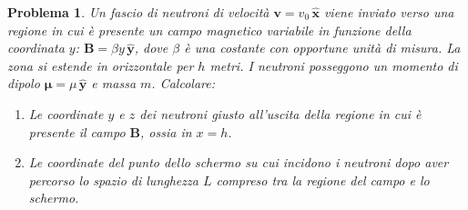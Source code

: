 \documentclass[b5paper,twoside]{book}
\newtheorem{problema}{Problema}
\renewcommand{\vec}[1]{\mathbf{#1}}
\renewcommand{\hat}[1]{\widehat{\mathbf{#1}}}
\begin{document}
\begin{problema}%
	Un fascio di neutroni di velocità $\vec{v} = v_{0}\,\hat{x}$ 
	viene inviato verso una regione in cui è presente un campo 
	magnetico variabile in funzione della coordinata $y$: 
	$\vec{B} = \beta y\,\hat{y}$, dove $\beta$ è una 
	costante con  opportune unità di misura. La zona si 
	estende in orizzontale per $h$ metri. I neutroni 
	posseggono un momento di dipolo $\vec{\mu} 
	= \mu\,\hat{y}$ e massa $m$. Calcolare:
	\begin{enumerate}
		\item Le coordinate $y$ e $z$ dei neutroni 
		giusto all'uscita della regione in cui è presente 
		il campo $\vec{B}$, ossia in $x=h$.
		\item Le coordinate del punto dello schermo 
		su cui incidono i neutroni dopo aver percorso lo 
		spazio di lunghezza $L$ compreso tra la regione 
		del campo e lo schermo.
	\end{enumerate}
\end{problema}
\end{document}
